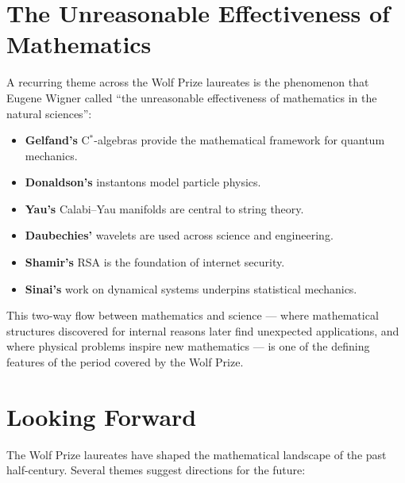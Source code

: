\section{The Unreasonable Effectiveness of Mathematics}

A recurring theme across the Wolf Prize laureates is the phenomenon that Eugene Wigner called ``the unreasonable effectiveness of mathematics in the natural sciences'':

\begin{itemize}
    \item \textbf{Gelfand's} C$^*$-algebras provide the mathematical framework for quantum mechanics.
    \item \textbf{Donaldson's} instantons model particle physics.
    \item \textbf{Yau's} Calabi--Yau manifolds are central to string theory.
    \item \textbf{Daubechies'} wavelets are used across science and engineering.
    \item \textbf{Shamir's} RSA is the foundation of internet security.
    \item \textbf{Sinai's} work on dynamical systems underpins statistical mechanics.
\end{itemize}

This two-way flow between mathematics and science --- where mathematical structures discovered for internal reasons later find unexpected applications, and where physical problems inspire new mathematics --- is one of the defining features of the period covered by the Wolf Prize.

\section{Looking Forward}

The Wolf Prize laureates have shaped the mathematical landscape of the past half-century. Several themes suggest directions for the future:

